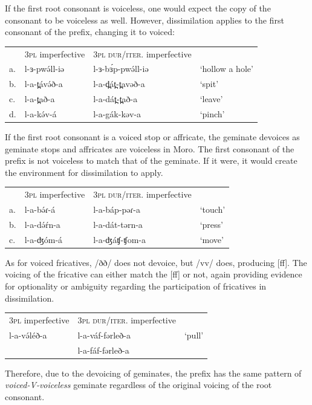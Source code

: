 If the first root consonant is voiceless, one would expect the copy of the consonant to be voiceless as well. However, dissimilation applies to the first consonant of the prefix, changing it to voiced:

\ea
\begin{tabular}[t]{llll}
&	 	3\textsc{pl} imperfective		&	3\textsc{pl} \textsc{dur}/\textsc{iter}. imperfective\\
a.&	l-ɜ-pwə́ll-iə	&	l-ɜ-bɜ́p-pwə́ll-iə	&	‘hollow a hole’\\
b.&	l-a-t̪ávə́ð-a	&	l-a-d̪át̪-t̪avəð-a	&	‘spit’\\
c.&	l-a-t̪að-a	&	l-a-dát̪-t̪að-a	&	‘leave’\\
d.&	l-a-kə́v-á	&	l-a-gák-kəv-a	&	‘pinch’\\
\end{tabular}
\z

If the first root consonant is a voiced stop or affricate, the geminate devoices as geminate stops and affricates are voiceless in Moro. The first consonant of the prefix is not voiceless to match that of the geminate. If it were, it would create the environment for dissimilation to apply. 

\ea
\begin{tabular}[t]{llll}
&	 3\textsc{pl} imperfective	&	3\textsc{pl} \textsc{dur}/\textsc{iter}. imperfective\\
a.&	l-a-bə́ɾ-á	&	l-a-báp-pəɾ-a	&	‘touch’\\
b.&	l-a-də́ŕn-a	&	l-a-dát-tərn-a	&	‘press’\\
c.&	l-a-ʤóm-á	&	l-a-ʤáʧ-ʧom-a	&	‘move’\\
\end{tabular}
\z

As for voiced fricatives, /ðð/ does not devoice, but /vv/ does, producing [ff]. The voicing of the fricative can either match the [ff] or not, again providing evidence for optionality or ambiguity regarding the participation of fricatives in dissimilation. 

\ea
\begin{tabular}[t]{lll}
3\textsc{pl} imperfective	&	3\textsc{pl} \textsc{dur}/\textsc{iter}. imperfective\\
l-a-və́léð-a	&	l-a-váf-fərleð-a		&	‘pull’\\
			&	l-a-fáf-fərleð-a\\
\end{tabular}
\z

Therefore, due to the devoicing of geminates, the prefix has the same pattern of \textit{voiced-V-voiceless} geminate regardless of the original voicing of the root consonant.

